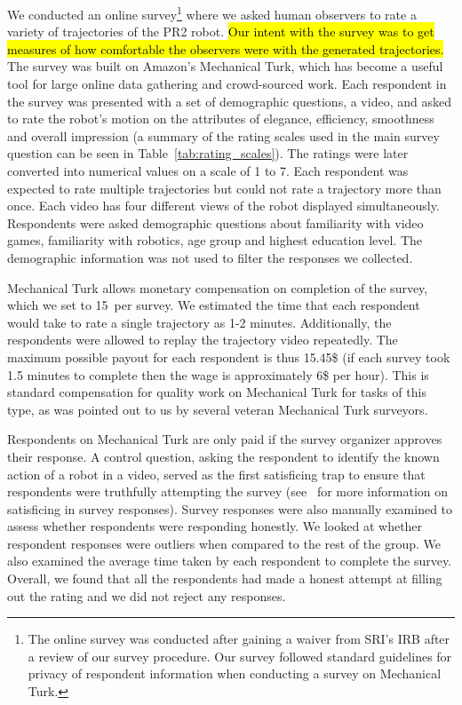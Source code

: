 \documentclass[letterpaper, 10 pt, conference]{ieeeconf}  %
\begin{document}
We conducted an online survey\footnote{The online survey was conducted after gaining a waiver from SRI's IRB after a review of our survey procedure. Our survey followed standard guidelines for privacy of respondent information when conducting a survey on Mechanical Turk.} where we asked human observers to rate a variety of trajectories of the PR2 robot. \hl{Our intent with the survey was to get measures of how comfortable the observers were with the generated trajectories.} The survey was built on Amazon's Mechanical Turk, which has become a useful tool for large online data gathering and crowd-sourced work. Each respondent in the survey was presented with a set of demographic questions, a video, and asked to rate the robot's motion on the attributes  of elegance, efficiency, smoothness and overall impression (a summary of the rating scales used in the main survey question can be seen in Table~\ref{tab:rating_scales}). The ratings were later converted into numerical values on a scale of 1 to 7. Each respondent was expected to rate multiple trajectories but could not rate a trajectory more than once. Each video has four different views of the robot displayed simultaneously. Respondents were asked demographic questions about familiarity with video games, familiarity with robotics, age group and highest education level. The demographic information was not used to filter the responses we collected.  

Mechanical Turk allows monetary compensation on completion of the survey, which we set to 15\textcent~per survey. We estimated the time that each respondent would take to rate a single trajectory as 1-2 minutes. Additionally, the respondents were allowed to replay the trajectory video repeatedly. The maximum possible payout for each respondent is thus 15.45\$ (if each survey took 1.5 minutes to complete then the wage is approximately 6\$ per hour). This is standard compensation for quality work on Mechanical Turk for tasks of this type, as was pointed out to us by several veteran Mechanical Turk surveyors. 

Respondents on Mechanical Turk are only paid if the survey organizer approves their response. A control question, asking the respondent to identify the known action of a robot in a video, served as the first satisficing trap to ensure that respondents were truthfully attempting the survey (see~\cite{krosnick1996satisficing} for more information on satisficing in survey responses). Survey responses were also manually examined to assess whether respondents were responding honestly. We looked at whether respondent responses were outliers when compared to the rest of the group. We also examined the average time taken by each respondent to complete the survey. Overall, we found that all the respondents had made a honest attempt at filling out the rating and we did not reject any responses. 
\end{document}
